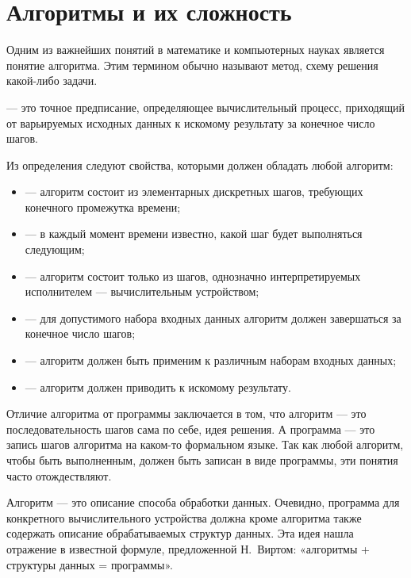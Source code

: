 \section{Алгоритмы и их сложность}


Одним из важнейших понятий в математике и компьютерных науках является
понятие алгоритма. Этим термином обычно называют метод, схему решения
какой-либо задачи.

\begin{defn}
   — это точное предписание, определяющее
  вычислительный процесс, приходящий от варьируемых исходных данных к
  искомому результату за конечное число шагов.
\end{defn}

Из определения следуют свойства, которыми должен обладать любой
алгоритм:

\begin{itemize}
\item {} — алгоритм состоит из
  элементарных дискретных шагов, требующих конечного промежутка
  времени;
\item {} — в каждый
  момент времени известно, какой шаг будет выполняться следующим;
\item {} — алгоритм состоит только из
  шагов, однозначно интерпретируемых исполнителем — вычислительным
  устройством;
\item {} — для допустимого набора входных
  данных алгоритм должен завершаться за конечное число шагов;
\item {} — алгоритм должен быть
  применим к различным наборам входных данных;
\item {} — алгоритм должен
  приводить к искомому результату.
\end{itemize}

Отличие алгоритма от программы заключается в том, что алгоритм — это
последовательность шагов сама по себе, идея решения. А программа — это
запись шагов алгоритма на каком-то формальном языке. Так как любой
алгоритм, чтобы быть выполненным, должен быть записан в виде
программы, эти понятия часто отождествляют.

Алгоритм — это описание способа обработки данных. Очевидно, программа
для конкретного вычислительного устройства должна кроме алгоритма
также содержать описание обрабатываемых структур данных. Эта идея
нашла отражение в известной формуле, предложенной Н.~Виртом:
«алгоритмы + структуры данных = программы».

